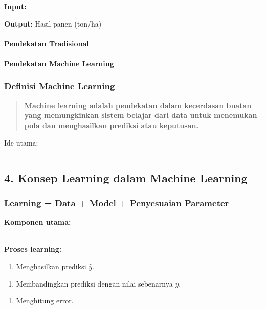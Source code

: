 \documentclass[12pt,a4paper]{article}
\begin{document}
\textbf{Input:}


\textbf{Output:} Hasil panen (ton/ha)


\paragraph{Pendekatan Tradisional}

\paragraph{Pendekatan Machine Learning}

\subsubsection{Definisi Machine Learning}

\begin{quote}
\textbf{Machine learning adalah pendekatan dalam kecerdasan buatan yang memungkinkan sistem belajar dari data untuk menemukan pola dan menghasilkan prediksi atau keputusan.}\end{quote}


Ide utama:


\hrule


\subsection{4. Konsep Learning dalam Machine Learning}

\subsubsection{Learning = Data + Model + Penyesuaian Parameter}

\textbf{Komponen utama:}


\\[
\hat{y} = f(X)
\\]


\textbf{Proses learning:}

\begin{enumerate}
\item Menghasilkan prediksi $\hat{y}$.
\end{enumerate}

\begin{enumerate}
\item Membandingkan prediksi dengan nilai sebenarnya $y$.
\end{enumerate}

\begin{enumerate}
\item Menghitung error.
\end{enumerate}
\end{document}
